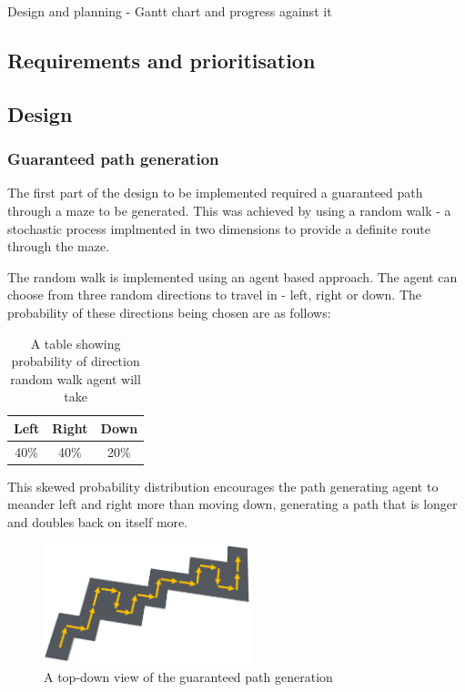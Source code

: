 \documentclass[progress]{cmpreport}
\begin{document}
\begin{section}{Design and planning}
- Gantt chart and progress against it

\subsection{Requirements and prioritisation}

\subsection{Design}
\subsubsection{Guaranteed path generation}
The first part of the design to be implemented required a guaranteed path through a maze to be generated. This was achieved by using a random walk - a stochastic process implmented in two dimensions to provide a definite route through the maze.

The random walk is implemented using an agent based approach. The agent can choose from three random  directions to travel in - left, right or down. The probability of these directions being chosen are as follows:

\begin{table}[h!]
    \centering
    \begin{tabular}{ |c|c|c| }
    \hline
    Left & Right & Down \\ 
    \hline
    40\% & 40\% & 20\%\\ 
    \hline
    \end{tabular}
    \caption{A table showing probability of direction random walk agent will take}
    \end{table}

This skewed probability distribution encourages the path generating agent to meander left and right more than moving down, generating a path that is longer and doubles back on itself more.

\begin{figure}
    \includegraphics[width=6cm]{img/1-maze.png}
    \caption{A top-down view of the guaranteed path generation}
    \label{fig:wrapfig}
    \end{figure}
\end{section}
\end{document}
